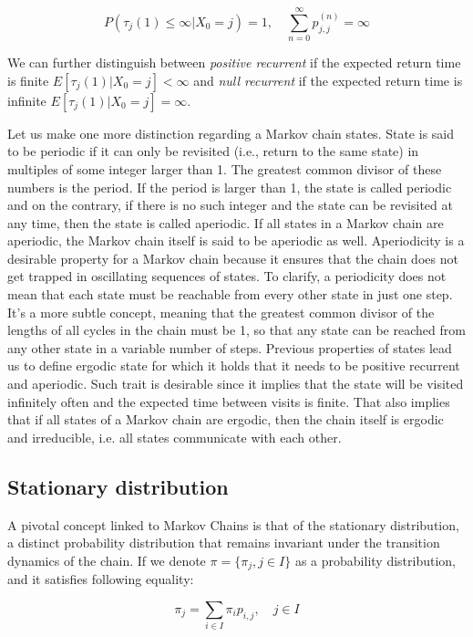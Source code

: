 \begin{equation}
P(\tau_j(1) \leq \infty|X_0=j) = 1, \quad \sum_{n=0}^{\infty} p_{j,j}^{(n)} = \infty
\end{equation}

We can further distinguish between {\it positive recurrent} if the expected return time is finite $E[\tau_j(1)|X_0=j] < \infty$ and {\it null recurrent} if the expected return time is infinite $E[\tau_j(1)|X_0=j] = \infty$.

Let us make one more distinction regarding a Markov chain states. State is said to be periodic if it can only be revisited (i.e., return to the same state) in multiples of some integer larger than 1. 
The greatest common divisor of these numbers is the period. If the period is larger than 1, the state is called periodic and 
on the contrary, if there is no such integer and the state can be revisited at any time, then the state is called aperiodic. 
If all states in a Markov chain are aperiodic, the Markov chain itself is said to be aperiodic as well. Aperiodicity is a desirable property for a Markov chain because it ensures that the chain does not get trapped in oscillating sequences of states. 
To clarify, a periodicity does not mean that each state must be reachable from every other state in just one step. It's a more subtle concept, meaning that the greatest common divisor of the lengths of all cycles in the chain must be 1, so that any state can be reached from any other state in a variable number of steps.
Previous properties of states lead us to define ergodic state for which it holds that it needs to be positive recurrent and aperiodic. Such trait is desirable since it implies that the state will be visited infinitely often and the expected time between visits is finite.
That also implies that if all states of a Markov chain are ergodic, then the chain itself is ergodic and irreducible, i.e. all states communicate with each other.

\subsection{Stationary distribution}

A pivotal concept linked to Markov Chains is that of the stationary distribution, a distinct probability 
distribution that remains invariant under the transition dynamics of the chain. 
If we denote $\pi = \{\pi_j,j \in I\}$ as a probability distribution, and it satisfies following equality:

\begin{equation}
    \pi_j = \sum_{i \in I} \pi_i p_{i,j}, \quad j \in I
\end{equation}

